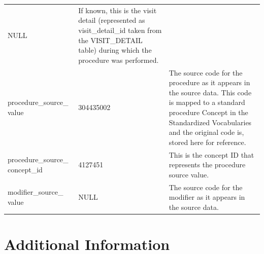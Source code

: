 \documentclass[11pt]{book}
\theoremstyle{definition}
\theoremstyle{definition}
\theoremstyle{definition}
\theoremstyle{remark}
\begin{document}
\begin{longtable}[]{@{}lll@{}}
\begin{minipage}[t]{0.15\columnwidth}
NULL\strut
\end{minipage} & \begin{minipage}[t]{0.49\columnwidth}\raggedright
If known, this is the visit detail (represented as visit\_detail\_id taken from the VISIT\_DETAIL table) during which the procedure was performed.\strut
\end{minipage}\tabularnewline
\begin{minipage}[t]{0.28\columnwidth}\raggedright
procedure\_source\_ value\strut
\end{minipage} & \begin{minipage}[t]{0.15\columnwidth}\raggedright
304435002\strut
\end{minipage} & \begin{minipage}[t]{0.49\columnwidth}\raggedright
The source code for the procedure as it appears in the source data. This code is mapped to a standard procedure Concept in the Standardized Vocabularies and the original code is, stored here for reference.\strut
\end{minipage}\tabularnewline
\begin{minipage}[t]{0.28\columnwidth}\raggedright
procedure\_source\_ concept\_id\strut
\end{minipage} & \begin{minipage}[t]{0.15\columnwidth}\raggedright
4127451\strut
\end{minipage} & \begin{minipage}[t]{0.49\columnwidth}\raggedright
This is the concept ID that represents the procedure source value.\strut
\end{minipage}\tabularnewline
\begin{minipage}[t]{0.28\columnwidth}\raggedright
modifier\_source\_ value\strut
\end{minipage} & \begin{minipage}[t]{0.15\columnwidth}\raggedright
NULL\strut
\end{minipage} & \begin{minipage}[t]{0.49\columnwidth}\raggedright
The source code for the modifier as it appears in the source data.\strut
\end{minipage}\tabularnewline
\bottomrule
\end{longtable}

\hypertarget{additional-information}{%
\section{Additional Information}\label{additional-information}}
\end{document}
